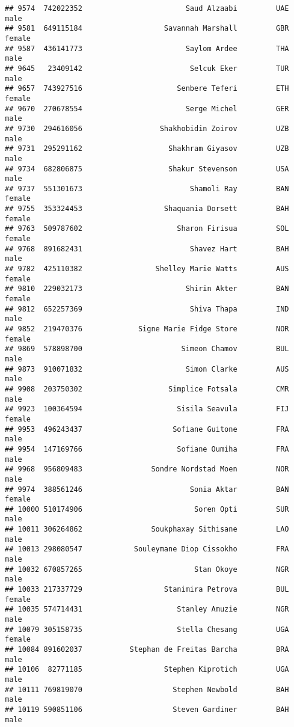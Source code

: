 \documentclass[]{article}
\begin{document}
\begin{verbatim}
## 9574  742022352                        Saud Alzaabi         UAE   male
## 9581  649115184                   Savannah Marshall         GBR female
## 9587  436141773                        Saylom Ardee         THA   male
## 9645   23409142                         Selcuk Eker         TUR   male
## 9657  743927516                      Senbere Teferi         ETH female
## 9670  270678554                        Serge Michel         GER   male
## 9730  294616056                  Shakhobidin Zoirov         UZB   male
## 9731  295291162                    Shakhram Giyasov         UZB   male
## 9734  682806875                    Shakur Stevenson         USA   male
## 9737  551301673                         Shamoli Ray         BAN female
## 9755  353324453                   Shaquania Dorsett         BAH female
## 9763  509787602                      Sharon Firisua         SOL female
## 9768  891682431                         Shavez Hart         BAH   male
## 9782  425110382                 Shelley Marie Watts         AUS female
## 9810  229032173                        Shirin Akter         BAN female
## 9812  652257369                         Shiva Thapa         IND   male
## 9852  219470376             Signe Marie Fidge Store         NOR female
## 9869  578898700                       Simeon Chamov         BUL   male
## 9873  910071832                        Simon Clarke         AUS   male
## 9908  203750302                    Simplice Fotsala         CMR   male
## 9923  100364594                      Sisila Seavula         FIJ female
## 9953  496243437                     Sofiane Guitone         FRA   male
## 9954  147169766                      Sofiane Oumiha         FRA   male
## 9968  956809483                Sondre Nordstad Moen         NOR   male
## 9974  388561246                         Sonia Aktar         BAN female
## 10000 510174906                          Soren Opti         SUR   male
## 10011 306264862                Soukphaxay Sithisane         LAO   male
## 10013 298080547            Souleymane Diop Cissokho         FRA   male
## 10032 670857265                          Stan Okoye         NGR   male
## 10033 217337729                   Stanimira Petrova         BUL female
## 10035 574714431                      Stanley Amuzie         NGR   male
## 10079 305158735                      Stella Chesang         UGA female
## 10084 891602037           Stephan de Freitas Barcha         BRA   male
## 10106  82771185                   Stephen Kiprotich         UGA   male
## 10111 769819070                     Stephen Newbold         BAH   male
## 10119 590851106                     Steven Gardiner         BAH   male

\end{verbatim}
\end{document}
